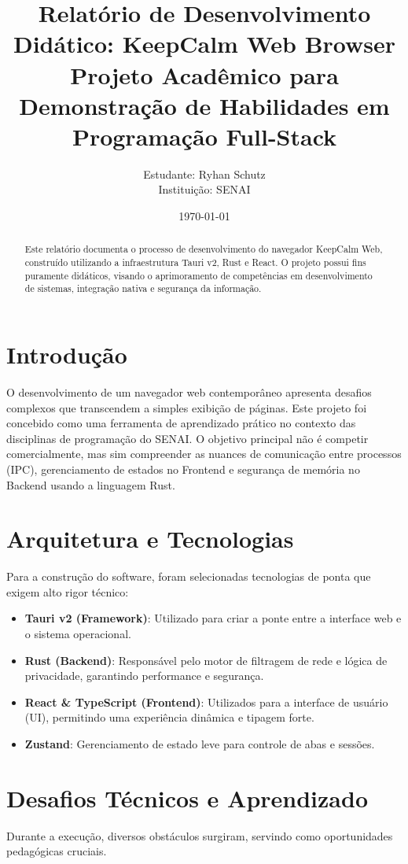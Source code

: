 \documentclass[12pt,a4paper]{article}
\title{
    \large \textbf{Relatório de Desenvolvimento Didático: KeepCalm Web Browser} \\
    \small Projeto Acadêmico para Demonstração de Habilidades em Programação Full-Stack
}
\author{Estudante: Ryhan Schutz \\ Instituição: SENAI}
\date{\today}
\begin{document}
\maketitle
\onehalfspacing

\begin{abstract}
Este relatório documenta o processo de desenvolvimento do navegador KeepCalm Web, construído utilizando a infraestrutura Tauri v2, Rust e React. O projeto possui fins puramente didáticos, visando o aprimoramento de competências em desenvolvimento de sistemas, integração nativa e segurança da informação.
\end{abstract}

\section{Introdução}
O desenvolvimento de um navegador web contemporâneo apresenta desafios complexos que transcendem a simples exibição de páginas. Este projeto foi concebido como uma ferramenta de aprendizado prático no contexto das disciplinas de programação do SENAI. O objetivo principal não é competir comercialmente, mas sim compreender as nuances de comunicação entre processos (IPC), gerenciamento de estados no Frontend e segurança de memória no Backend usando a linguagem Rust.

\section{Arquitetura e Tecnologias}
Para a construção do software, foram selecionadas tecnologias de ponta que exigem alto rigor técnico:

\begin{itemize}
    \item \textbf{Tauri v2 (Framework)}: Utilizado para criar a ponte entre a interface web e o sistema operacional.
    \item \textbf{Rust (Backend)}: Responsável pelo motor de filtragem de rede e lógica de privacidade, garantindo performance e segurança.
    \item \textbf{React \& TypeScript (Frontend)}: Utilizados para a interface de usuário (UI), permitindo uma experiência dinâmica e tipagem forte.
    \item \textbf{Zustand}: Gerenciamento de estado leve para controle de abas e sessões.
\end{itemize}

\section{Desafios Técnicos e Aprendizado}
Durante a execução, diversos obstáculos surgiram, servindo como oportunidades pedagógicas cruciais.
\end{document}
